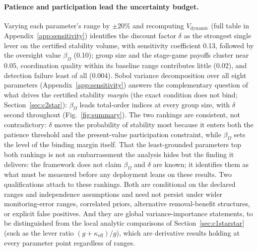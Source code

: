 \documentclass[manuscript,screen,review]{jair}
\newcommand{\SensOmega}{0.10}          %
\newcommand{\SensDelta}{0.13}          %
\newcommand{\SensAlpha}{0.02}          %
\newcommand{\SensQ}{0.004}             %
\begin{document}
\paragraph{Patience and participation lead the uncertainty budget.}
Varying each parameter's range by $\pm 20\%$ and recomputing $V_{\mathrm{dynamic}}$ (full table in Appendix~\ref{app:sensitivity}) identifies the discount factor $\delta$ as the strongest single lever on the certified stability volume, with sensitivity coefficient \SensDelta{}, followed by the oversight value $\beta_\Omega$ (\SensOmega{}); group size and the stage-game payoffs cluster near $0.05$, coordination quality within its baseline range contributes little (\SensAlpha{}), and detection failure least of all (\SensQ{}). Sobol variance decomposition over all eight parameters (Appendix~\ref{app:sensitivity}) answers the complementary question of what drives the certified stability \emph{margin} (the exact condition does not bind; Section~\ref{sec:c2star}): $\beta_\Omega$ leads total-order indices at every group size, with $\delta$ second throughout (Fig.~\ref{fig:summary}). The two rankings are consistent, not contradictory: $\delta$ moves the probability of stability most because it enters both the patience threshold and the present-value participation constraint, while $\beta_\Omega$ sets the level of the binding margin itself. That the least-grounded parameters top both rankings is not an embarrassment the analysis hides but the finding it delivers: the framework does not claim $\beta_\Omega$ and $\delta$ are known; it identifies them as what must be measured before any deployment leans on these results. Two qualifications attach to these rankings. Both are conditional on the declared ranges and independence assumptions and need not persist under wider monitoring-error ranges, correlated priors, alternative removal-benefit structures, or explicit false positives. And they are global variance-importance statements, to be distinguished from the local analytic comparisons of Section~\ref{sec:c1starstar} (such as the lever ratio $(g+\kappa_{\mathrm{eff}})/g$), which are derivative results holding at every parameter point regardless of ranges.
\end{document}
